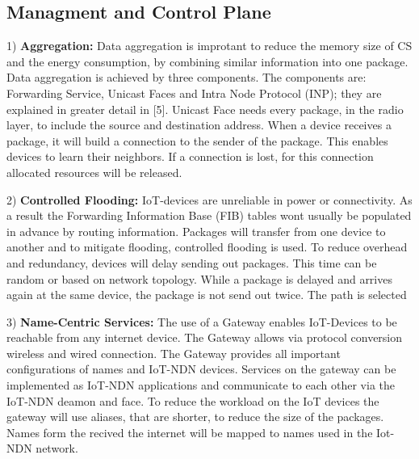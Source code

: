 \documentclass[conference]{IEEEtran}
\begin{document}
\subsection{Managment and Control Plane}
1) \textbf{Aggregation:} Data aggregation is improtant to reduce the memory size of CS and the energy consumption, by combining similar information into one package. Data aggregation is achieved by three components. The components are: Forwarding Service, Unicast Faces and Intra Node Protocol (INP); they are explained in greater detail in [5]. 
Unicast Face needs every package, in the radio layer, to include the source and destination address. 
When a device receives a package, it will build a connection to the sender of the package. 
This enables devices to learn their neighbors. %
If a connection is lost, for this connection allocated resources will be released. 

2) \textbf{Controlled Flooding:}
IoT-devices are unreliable in power or connectivity. %
As a result the Forwarding Information Base (FIB) tables wont usually be populated in advance by routing information. %
Packages will transfer from one device to another and to mitigate flooding, controlled flooding is used.
To reduce overhead and redundancy, devices will delay sending out packages. This time can be random or based on network topology.
While a package is delayed and arrives  again at the same device, the package is not send out twice. 
The path is selected

3) \textbf{Name-Centric Services:}
The use of a Gateway enables IoT-Devices to be reachable from any internet device. 
The Gateway allows via protocol conversion wireless and wired connection. %
The Gateway provides all important configurations of names and  IoT-NDN devices. Services on the gateway can be implemented as IoT-NDN applications and communicate to each other via the IoT-NDN deamon and face. %
To reduce the workload on the IoT devices the gateway will use aliases, that are shorter, to reduce the size  of the packages.
Names form the recived  the internet will be mapped to names used in the Iot-NDN network.
\end{document}
